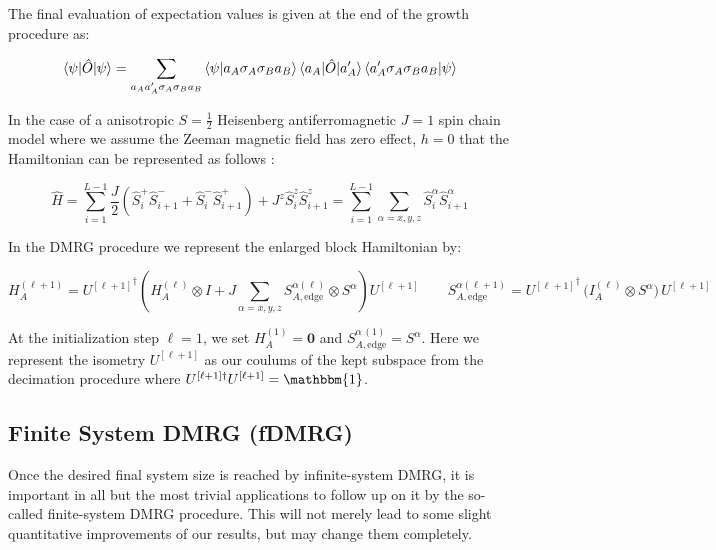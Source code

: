 \documentclass{article}
\begin{document}
\noindent The final evaluation of expectation values is given at the end of the growth procedure as:

\begin{align*}
\braket{\psi | \hat{O} | \psi} = 
\sum_{a_A a'_A \sigma_A \sigma_B a_B} 
\braket{\psi | a_A \sigma_A \sigma_B a_B} 
\braket{a_A | \hat{O} | a'_A} 
\braket{a'_A \sigma_A \sigma_B a_B | \psi}
\end{align*} 

\noindent In the case of a anisotropic $S = \frac12$ Heisenberg antiferromagnetic $J = 1$ spin chain model where we assume the Zeeman magnetic field has zero effect, $h=0$ that the Hamiltonian can be represented as follows :

\[
 \hat H =\sum_{i=1}^{L-1} \frac{J}{2} \left( \hat{S}_i^+ \hat{S}_{i+1}^- + \hat{S}_i^- \hat{S}_{i+1}^+ \right) + J^z \hat{S}_i^z \hat{S}_{i+1}^z = \sum_{i=1}^{L-1} \sum_{\alpha=x,y,z} \hat{S}_i^\alpha \hat{S}_{i+1}^\alpha 
\]

\noindent In the DMRG procedure we represent the enlarged block Hamiltonian by:

\[
H_{A}^{(\ell+1)}
= {U^{[\ell+1]}}^{\!\dagger}\!\left(
  H_{A}^{(\ell)}\otimes I
  + J\sum_{\alpha=x,y,z}
    S_{A,\mathrm{edge}}^{\alpha(\ell)}\otimes S^{\alpha}
\right) U^{[\ell+1]} \qquad S_{A,\mathrm{edge}}^{\alpha(\ell+1)}
= {U^{[\ell+1]}}^{\!\dagger}\,\bigl(I_{A}^{(\ell)}\otimes S^{\alpha}\bigr)\,U^{[\ell+1]} 
\]

\noindent At the initialization step \(\ell=1\), we set \(H_A^{(1)}=\mathbf0\) and \(S_{A,\mathrm{edge}}^{\alpha\,(1)}=S^\alpha\). Here we represent the isometry $U^{[\ell+1]}$ as our coulums of the kept subspace from the decimation procedure where $U^{[\ell+1]\dagger}U^{[\ell+1]} = \mathbbm{1}$.

\subsection{Finite System DMRG (fDMRG)}\label{subsec:fdmrg}

\noindent Once the desired final system size is reached by infinite-system DMRG, it is important in all but the most trivial applications to follow up on it by the so-called finite-system DMRG procedure. This will not merely lead to some slight quantitative improvements of our results, but may change them completely. 

\vspace{1em}
\end{document}
